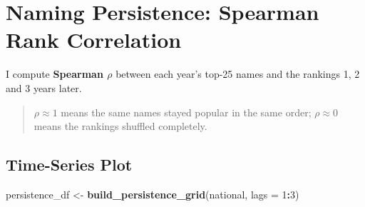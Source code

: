 \documentclass[
]{article}
\newenvironment{Shaded}{\begin{snugshade}}{\end{snugshade}}
\newcommand{\AttributeTok}[1]{\textcolor[rgb]{0.13,0.29,0.53}{#1}}
\newcommand{\DecValTok}[1]{\textcolor[rgb]{0.00,0.00,0.81}{#1}}
\newcommand{\FunctionTok}[1]{\textcolor[rgb]{0.13,0.29,0.53}{\textbf{#1}}}
\newcommand{\NormalTok}[1]{#1}
\newcommand{\OtherTok}[1]{\textcolor[rgb]{0.56,0.35,0.01}{#1}}
\newcommand{\SpecialCharTok}[1]{\textcolor[rgb]{0.81,0.36,0.00}{\textbf{#1}}}
\begin{document}
\newpage

\section{Naming Persistence: Spearman Rank
Correlation}\label{naming-persistence-spearman-rank-correlation}

I compute \textbf{Spearman \(\rho\)} between each year's top-25 names
and the rankings 1, 2 and 3 years later.

\begin{quote}
\(\rho \approx 1\) means the same names stayed popular in the same
order; \(\rho \approx 0\) means the rankings shuffled completely.
\end{quote}

\subsection{Time-Series Plot}\label{time-series-plot}

\begin{Shaded}
\begin{Highlighting}[]
\NormalTok{persistence\_df }\OtherTok{\textless{}{-}} \FunctionTok{build\_persistence\_grid}\NormalTok{(national, }\AttributeTok{lags =} \DecValTok{1}\SpecialCharTok{:}\DecValTok{3}\NormalTok{)}
\end{Highlighting}
\end{Shaded}
\end{document}
